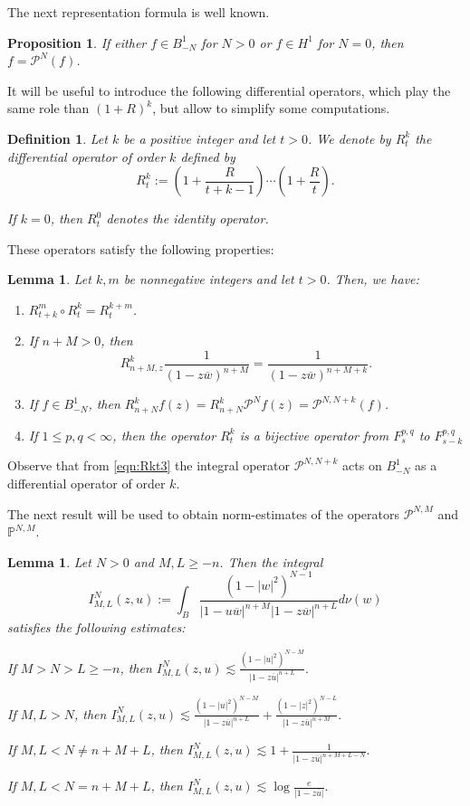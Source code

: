 \documentclass[12pt,twoside,leqno,final]{amsart}
\theoremstyle{plain}
\newtheorem{lem}[thm]{Lemma}
\newtheorem{defn}[thm]{Definition}
\newtheorem{prop}[thm]{Proposition}
\begin{document}
The next representation formula is well known.
\begin{prop}\label{prop:repPNN}
If either $f\in B^1_{-N}$ for $N>0$ or $f\in H^1$ for $N=0$, then $f={{\mathcal P}}^{N}(f)$.
\end{prop}

It will be useful to introduce the following differential operators, 
which play the same role than  $(1+R)^k$, but allow to simplify some computations.

\begin{defn}
Let $k$ be a positive integer and let $t>0$. We denote by  $R^k_t$ the differential operator of order $k$ defined by 
$$
R^k_{t}:=\left(1+\frac{R}{t+k-1}\right)\cdots\left(1+\frac{R}{t}\right).
$$

If $k=0$, then $R^0_{t}$ denotes the identity operator.
\end{defn}

These operators satisfy the following properties:
\begin{lem} \label{lem:Rkt}
Let $k,m$ be nonnegative integers and let $t>0$. Then, we have:
\begin{enumerate}
	\item $R^m_{t+k}\circ R^k_t=R^{k+m}_t$.
	\item If $n+M>0$, then 
\begin{equation*}
R^{k}_{n+M,z}\frac{1}{(1-z\overline w)^{n+M}}=\frac{1}{(1-z\overline w)^{n+M+k}}.
\end{equation*}
	\item \label{eqn:Rkt3} If $f\in B^1_{-N}$, then $R^k_{n+N}f(z)=R^k_{n+N}{{\mathcal P}}^Nf(z)={{\mathcal P}}^{N,N+k}(f)$.
	\item If $1\le p,q<\infty$, then the operator $R^k_t$ is a bijective operator from $F^{p,q}_s$ to $F^{p,q}_{s-k}$
\end{enumerate}
\end{lem}

Observe that 
from \eqref{eqn:Rkt3} 
the integral operator ${{\mathcal P}}^{N,N+k}$ acts on $B^1_{-N}$ as a differential operator of order $k$. 

The next result will be used to obtain norm-estimates of the operators ${{\mathcal P}}^{N,M}$ and ${\mathbb{P}}^{N,M}$.

\begin{lem}\label{lem:estP}  Let $N>0$ and $M,L\ge -n$. Then the integral 
$$
I^N_{M,L}(z,u):=\int_B\frac{(1-|w|^2)^{N-1}}{|1-u\overline w|^{n+M}|1-z\overline w|^{n+L}}d\nu(w)
$$
satisfies the following estimates:

If $M>N>L\ge -n$, then
$\displaystyle{
I^N_{M,L}(z,u)\lesssim 
\frac{(1-|u|^2)^{N-M}}{|1-z\overline u|^{n+L}}.
}$

If $M,L>N$, then
$\displaystyle{
I^N_{M,L}(z,u)
\lesssim \frac{(1-|u|^2)^{N-M}}{|1-z\overline u|^{n+L}}+\frac{(1-|z|^2)^{N-L}}{|1-z\overline u|^{n+M}}.
}$

If $M,L<N\ne n+M+L$, then
$\displaystyle{
I^N_{M,L}(z,u)
\lesssim 1+\frac{1}{|1-z\overline u|^{n+M+L-N}}.
}$

If $M,L<N=n+M+L$, then 
$\displaystyle{
I^N_{M,L}(z,u)
\lesssim \log \frac{e}{|1-z\overline u|}.
}$
\end{lem}
 
\end{document}
